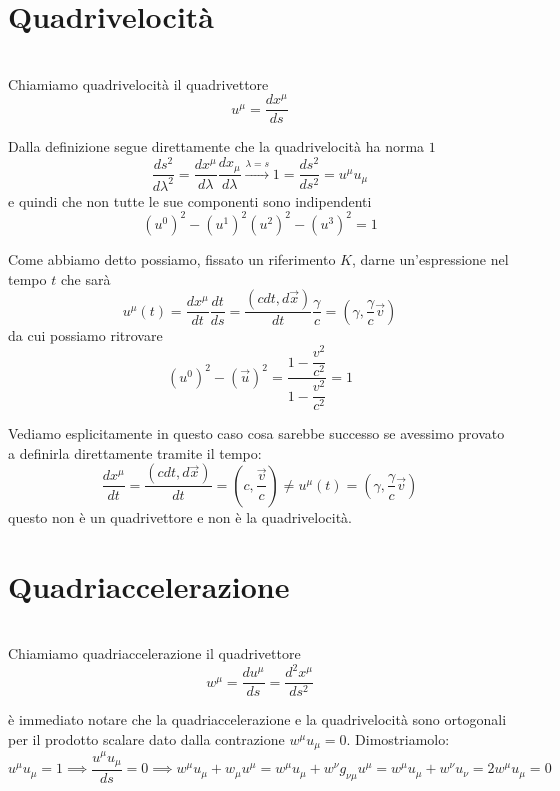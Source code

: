 \documentclass[12pt,a4paper,titlepage, twoside, openright]{book}
\newenvironment{definizione}[1][\empty]{\begin{Definizione}{
\ifx\empty#1\relax\else\mdseries\itshape#1\\\fi
}{}}{\end{Definizione}}
\numberwithin{equation}{chapter}
\begin{document}
\section{Quadrivelocità}
\begin{definizione}
Chiamiamo quadrivelocità il quadrivettore
\[
u^\mu=\dfrac{dx^\mu}{ds}
\]
\end{definizione}
Dalla definizione segue direttamente che la quadrivelocità ha norma $1$
\[
\dfrac{ds^2}{d\lambda^2}=\dfrac{dx^\mu}{d\lambda}\dfrac{dx_\mu}{d\lambda} \overset{\lambda=s}{\longrightarrow} 1=\dfrac{ds^2}{ds^2}=u^\mu u_\mu
\]
e quindi che non tutte le sue componenti sono indipendenti
\[
(u^0)^2-(u^1)^2(u^2)^2-(u^3)^2=1
\]


Come abbiamo detto possiamo, fissato un riferimento $K$, darne un'espressione nel tempo $t$ che sarà
\begin{equation}
u^\mu(t)=
\dfrac{dx^\mu}{dt}\dfrac{dt}{ds}=\dfrac{(cdt,d\vec{x})}{dt}\dfrac{\gamma}{c}=\left(\gamma,\dfrac{\gamma}{c}\vec{v}\right)
\end{equation}
da cui possiamo ritrovare 
\[
(u^0)^2-(\vec{u})^2=
\dfrac{1-\dfrac{v^2}{c^2}}{1-\dfrac{v^2}{c^2}}=1
\]

Vediamo esplicitamente in questo caso cosa sarebbe successo se avessimo provato a definirla direttamente tramite il tempo:
\[
\dfrac{dx^\mu}{dt}=\dfrac{(cdt,d\vec{x})}{dt}=\left( c,\dfrac{\vec{v}}{c} \right) \neq u^\mu(t)= \left(\gamma,\dfrac{\gamma}{c}\vec{v}\right)
\]
questo non è un quadrivettore e non è la quadrivelocità.


\section{Quadriaccelerazione}
\begin{definizione}
Chiamiamo quadriaccelerazione il quadrivettore
\[
w^\mu=\dfrac{du^\mu}{ds}=\dfrac{d^2x^\mu}{ds^2}
\]
\end{definizione}
è immediato notare che la quadriaccelerazione e la quadrivelocità sono ortogonali per il prodotto scalare dato dalla contrazione $w^\mu u_\mu =0$. Dimostriamolo:
\[
u^\mu u_\mu=1\implies \dfrac{u^\mu u_\mu}{ds}=0 \implies w^\mu u_\mu+w_\mu u^\mu =w^\mu u_\mu + w^\nu g_{\nu\mu} u^\mu = w^\mu u_\mu + w^\nu u_\nu = 2 w^\mu u_\mu = 0
\]
\end{document}
